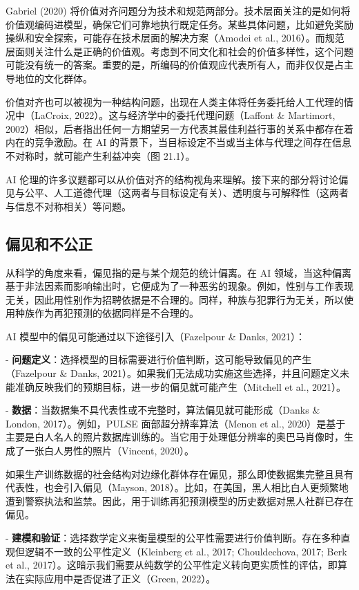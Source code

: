 Gabriel (2020) 将价值对齐问题分为技术和规范两部分。技术层面关注的是如何将价值观编码进模型，确保它们可靠地执行既定任务。某些具体问题，比如避免奖励操纵和安全探索，可能存在技术层面的解决方案（Amodei et al., 2016）。而规范层面则关注什么是正确的价值观。考虑到不同文化和社会的价值多样性，这个问题可能没有统一的答案。重要的是，所编码的价值观应代表所有人，而非仅仅是占主导地位的文化群体。

价值对齐也可以被视为一种结构问题，出现在人类主体将任务委托给人工代理的情况中（LaCroix, 2022）。这与经济学中的委托代理问题（Laffont \& Martimort, 2002）相似，后者指出任何一方期望另一方代表其最佳利益行事的关系中都存在着内在的竞争激励。在 AI 的背景下，当目标设定不当或当主体与代理之间存在信息不对称时，就可能产生利益冲突（图 21.1）。

AI 伦理的许多议题都可以从价值对齐的结构视角来理解。接下来的部分将讨论偏见与公平、人工道德代理（这两者与目标设定有关）、透明度与可解释性（这两者与信息不对称相关）等问题。

\subsection{偏见和不公正}
从科学的角度来看，偏见指的是与某个规范的统计偏离。在 AI 领域，当这种偏离基于非法因素而影响输出时，它便成为了一种恶劣的现象。例如，性别与工作表现无关，因此用性别作为招聘依据是不合理的。同样，种族与犯罪行为无关，所以使用种族作为再犯预测的依据同样是不合理的。

AI 模型中的偏见可能通过以下途径引入（Fazelpour \& Danks, 2021）：

- \textbf{问题定义}：选择模型的目标需要进行价值判断，这可能导致偏见的产生（Fazelpour \& Danks, 2021）。如果我们无法成功实施这些选择，并且问题定义未能准确反映我们的预期目标，进一步的偏见就可能产生（Mitchell et al., 2021）。

- \textbf{数据}：当数据集不具代表性或不完整时，算法偏见就可能形成（Danks \& London, 2017）。例如，PULSE 面部超分辨率算法（Menon et al., 2020）是基于主要是白人名人的照片数据库训练的。当它用于处理低分辨率的奥巴马肖像时，生成了一张白人男性的照片（Vincent, 2020）。

如果生产训练数据的社会结构对边缘化群体存在偏见，那么即使数据集完整且具有代表性，也会引入偏见（Mayson, 2018）。比如，在美国，黑人相比白人更频繁地遭到警察执法和监禁。因此，用于训练再犯预测模型的历史数据对黑人社群已存在偏见。

- \textbf{建模和验证}：选择数学定义来衡量模型的公平性需要进行价值判断。存在多种直观但逻辑不一致的公平性定义（Kleinberg et al., 2017; Chouldechova, 2017; Berk et al., 2017）。这暗示我们需要从纯数学的公平性定义转向更实质性的评估，即算法在实际应用中是否促进了正义（Green, 2022）。

